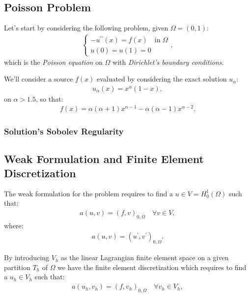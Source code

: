 \subsection{Poisson Problem}

Let's start by considering the following problem, given $\Omega = (0, 1)$:
\begin{gather}
	\begin{cases}
		-u^{\prime \prime}(x) = f(x) \quad \text{in } \Omega \\
		u(0) = u(1) = 0
	\end{cases},
\end{gather}
which is the \textit{Poisson equation} on $\Omega$ with \textit{Dirichlet's boundary conditions}.

We'll consider a source $f(x)$ evaluated by considering the exact solution $u_{\alpha}$:
\begin{gather}
	u_{\alpha}(x) = x^{\alpha} (1 - x),
\end{gather}
on $\alpha > 1.5$, so that:
\begin{gather}
	f(x) = \alpha (\alpha + 1) x^{\alpha - 1} - \alpha (\alpha - 1) x^{\alpha - 2}.
\end{gather}

\subsubsection{Solution's Sobolev Regularity}


\subsection{Weak Formulation and Finite Element Discretization} \label{fem_definition}

The weak formulation for the problem requires to find a $u \in V = H_0^1(\Omega)$ such that:
\begin{gather}
	a(u, v) = (f, v)_{0, \Omega} \quad \forall v \in V,
\end{gather}
where:
\begin{gather}
	a(u, v) = (u^{\prime}, v^{\prime})_{0, \Omega}.
\end{gather}

By introducing $V_h$ as the linear Lagrangian finite element space on a given partition $T_h$ of $\Omega$ we have the finite element discretization which requires to find a $u_h \in V_h$ such that:
\begin{gather}
	a(u_h, v_h) = (f, v_h)_{0, \Omega} \quad \forall v_h \in V_h,
\end{gather}